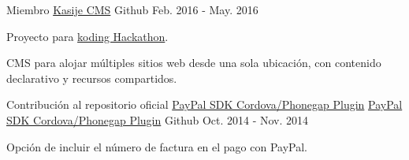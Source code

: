 \begin{cventries}
  \cventry
    {Miembro} %
    {\href{https://github.com/touwolf/kasije}{Kasije CMS}} %
    {\faGithubSquare\acvHeaderIconSep Github} %
    {Feb. 2016 - May. 2016} %
    {
      \begin{cvitems} %
        \item {Proyecto para \href{https://www.koding.com/Hackathon}{koding Hackathon}.}
        \item {CMS para alojar múltiples sitios web desde una sola ubicación, con contenido declarativo y recursos compartidos.}
      \end{cvitems}
    }

  \cventry
    {Contribución al repositorio oficial \href{https://github.com/paypal/PayPal-Cordova-Plugin}{PayPal SDK Cordova/Phonegap Plugin}} %
    {\faPaypal \hphantom{-} \href{https://github.com/miche-atucha/PayPal-Cordova-Plugin}{PayPal SDK Cordova/Phonegap Plugin}} %
    {\faGithubSquare\acvHeaderIconSep Github} %
    {Oct. 2014 - Nov. 2014} %
    {
      \begin{cvitems} %
        \item {Opción de incluir el número de factura en el pago con PayPal.}
      \end{cvitems}
    }

\end{cventries}
